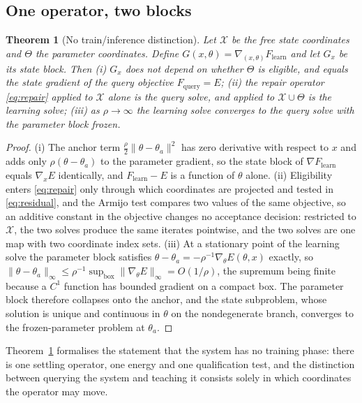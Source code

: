 \documentclass[11pt]{article}
\newtheorem{theorem}{Theorem}
\theoremstyle{definition}
\theoremstyle{remark}
\newcommand{\cX}{\mathcal{X}}
\begin{document}
\subsection{One operator, two blocks}
\begin{theorem}[No train/inference distinction]
\label{thm:oneop}
Let $\cX$ be the free state coordinates and $\Theta$ the parameter coordinates. Define
$G(x,\theta)=\nabla_{(x,\theta)}F_{\text{learn}}$ and let $G_x$ be its state block. Then (i) $G_x$ does
not depend on whether $\Theta$ is eligible, and equals the state gradient of the query objective
$F_{\text{query}}=E$; (ii) the repair operator \eqref{eq:repair} applied to $\cX$ alone is the query
solve, and applied to $\cX\cup\Theta$ is the learning solve; (iii) as $\rho\to\infty$ the learning
solve converges to the query solve with the parameter block frozen.
\end{theorem}
\begin{proof}
(i) The anchor term $\tfrac{\rho}{2}\|\theta-\theta_a\|^2$ has zero derivative with respect to $x$
and adds only $\rho(\theta-\theta_a)$ to the parameter gradient, so the state block of
$\nabla F_{\text{learn}}$ equals $\nabla_x E$ identically, and $F_{\text{learn}}-E$ is a function of
$\theta$ alone. (ii) Eligibility enters \eqref{eq:repair}
only through which coordinates are projected and tested in \eqref{eq:residual}, and the Armijo test
compares two values of the same objective, so an additive constant in the objective changes no
acceptance decision: restricted to $\cX$, the two solves produce the same iterates pointwise, and the
two solves are one map with two coordinate index sets. (iii) At a stationary point of the learning solve
the parameter block satisfies $\theta-\theta_a=-\rho^{-1}\nabla_\theta E(\theta,x)$ exactly, so
$\|\theta-\theta_a\|_\infty\le\rho^{-1}\sup_{\text{box}}\|\nabla_\theta E\|_\infty=O(1/\rho)$, the
supremum being finite because a $C^1$ function has bounded gradient on a compact box. The parameter
block therefore collapses onto the anchor, and the state subproblem, whose solution is unique and
continuous in $\theta$ on the nondegenerate branch, converges to the frozen-parameter problem at
$\theta_a$.
\end{proof}

Theorem~\ref{thm:oneop} formalises the statement that the system has no training phase: there is one
settling operator, one energy and one qualification test, and the distinction between querying the
system and teaching it consists solely in which coordinates the operator may move.
\end{document}
